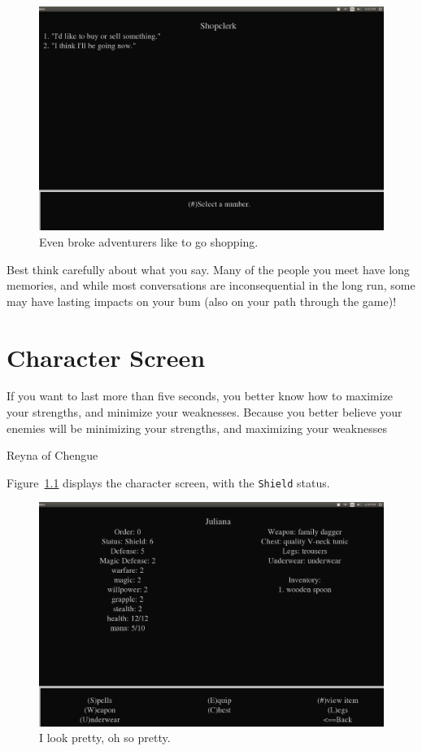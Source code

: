 \documentclass{report}
\begin{document}
   \begin{figure}[h!]
        \includegraphics[width=\textwidth]{talking}
        \caption{Even broke adventurers like to go shopping.}
        \label{fig_shopping}
    \end{figure}
    
    Best think carefully about what you say.
    Many of the people you meet have long memories, and while most conversations are inconsequential in the long run, some may have lasting impacts on your bum (also 
    on your path through the game)!

\chapter{Character Screen}
\label{ch_chararacter_screen}
\epigraph{If you want to last
more than five seconds, you better know how to maximize your strengths, and 
minimize your weaknesses. Because you better believe your enemies will be 
minimizing your strengths, and maximizing your weaknesses}{Reyna of Chengue}

Figure~\ref{fig_char_screen} displays the character screen, with the 
\verb|Shield| status.

\begin{figure}[h!]
    \includegraphics[width=\textwidth]{character_sheet}
    \caption{I look pretty, oh so pretty.}
    \label{fig_char_screen}
\end{figure}
\end{document}
